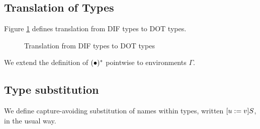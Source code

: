 \subsection{Translation of Types}

\begin{DEFINITION}
    \label{translation}
    Figure \ref{figure_translation} defines translation from DIF types to DOT
    types.
\end{DEFINITION}

\begin{figure}[h]
    
    \caption{Translation from DIF types to DOT types}
    \label{figure_translation}
\end{figure}

We extend the definition of $(\bullet)^{*}$ pointwise to environments
$\Gamma$.

\subsection{Type substitution}

\begin{DEFINITION}
    \label{substitution}
    We define capture-avoiding substitution of names within types, written
    $[u := v]S$, in the usual way.
\end{DEFINITION}
